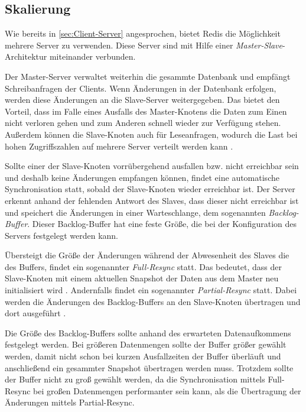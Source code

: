 
\subsection{Skalierung}
\label{sec:Skalierung}
Wie bereits in \autoref{sec:Client-Server} angesprochen, bietet Redis die Möglichkeit mehrere Server zu verwenden.
Diese Server sind mit Hilfe einer \textit{Master-Slave}-Architektur miteinander verbunden.

Der Master-Server verwaltet weiterhin die gesammte Datenbank und empfängt Schreibanfragen der Clients.
Wenn Änderungen in der Datenbank erfolgen, werden diese Änderungen an die Slave-Server weitergegeben.
Das bietet den Vorteil, dass im Falle eines Ausfalls des Master-Knotens die Daten zum Einen nicht verloren gehen und zum Anderen schnell wieder zur Verfügung stehen.
Außerdem können die Slave-Knoten auch für Leseanfragen, wodurch die Last bei hohen Zugriffszahlen auf mehrere Server verteilt werden kann \cite[141]{3}.

Sollte einer der Slave-Knoten vorrübergehend ausfallen bzw. nicht erreichbar sein und deshalb keine Änderungen empfangen können, findet eine automatische Synchronisation statt, sobald der Slave-Knoten wieder erreichbar ist.
Der Server erkennt anhand der fehlenden Antwort des Slaves, dass dieser nicht erreichbar ist und speichert die Änderungen in einer Warteschlange, dem sogenannten \textit{Backlog-Buffer}. 
Dieser Backlog-Buffer hat eine feste Größe, die bei der Konfiguration des Servers festgelegt werden kann. 

Übersteigt die Größe der Änderungen während der Abwesenheit des Slaves die des Buffers, findet ein sogenannter \textit{Full-Resync} statt.
Das bedeutet, dass der Slave-Knoten mit einem aktuellen Snapshot der Daten aus dem Master neu initialisiert wird \cite{Redis-Docs-Replication}.
Andernfalls findet ein sogenannter \textit{Partial-Resync} statt. Dabei werden die Änderungen des Backlog-Buffers an den Slave-Knoten übertragen und dort ausgeführt \cite[146 - 153]{3}.

Die Größe des Backlog-Buffers sollte anhand des erwarteten Datenaufkommens festgelegt werden. 
Bei größeren Datenmengen sollte der Buffer größer gewählt werden, damit nicht schon bei kurzen Ausfallzeiten der Buffer überläuft und anschließend ein gesammter Snapshot übertragen werden muss.
Trotzdem sollte der Buffer nicht zu groß gewählt werden, da die Synchronisation mittels Full-Resync bei großen Datenmengen performanter sein kann, als die Übertragung der Änderungen mittels Partial-Resync.

